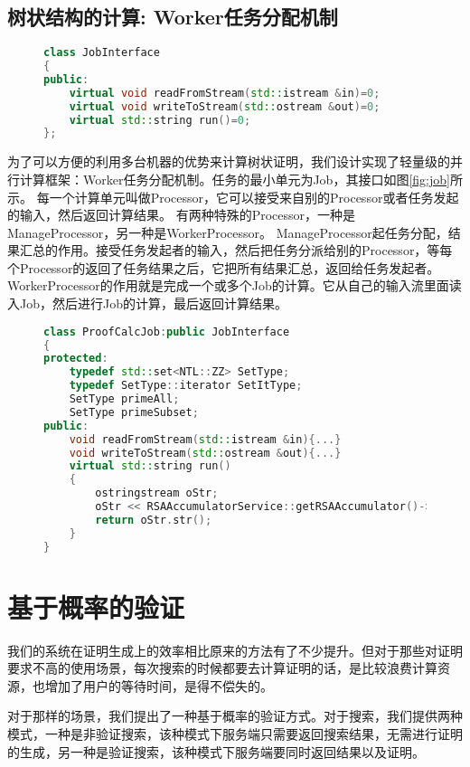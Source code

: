 \subsection{树状结构的计算: Worker任务分配机制}
\begin{figure}[htb]
\begin{lstlisting}[language=C++] 
class JobInterface
{
public:
    virtual void readFromStream(std::istream &in)=0;
    virtual void writeToStream(std::ostream &out)=0;
    virtual std::string run()=0;
};
\end{lstlisting}
\end{figure}

为了可以方便的利用多台机器的优势来计算树状证明，我们设计实现了轻量级的并行计算框架：Worker任务分配机制。任务的最小单元为Job，其接口如图\ref{fig:job}所示。
每一个计算单元叫做Processor，它可以接受来自别的Processor或者任务发起的输入，然后返回计算结果。
有两种特殊的Processor，一种是ManageProcessor，另一种是WorkerProcessor。
ManageProcessor起任务分配，结果汇总的作用。接受任务发起者的输入，然后把任务分派给别的Processor，等每个Processor的返回了任务结果之后，它把所有结果汇总，返回给任务发起者。
WorkerProcessor的作用就是完成一个或多个Job的计算。它从自己的输入流里面读入Job，然后进行Job的计算，最后返回计算结果。
\begin{figure}[htb]
\begin{lstlisting}[language=C++] 
class ProofCalcJob:public JobInterface
{
protected:
    typedef std::set<NTL::ZZ> SetType;
    typedef SetType::iterator SetItType;
    SetType primeAll;
    SetType primeSubset;
public:
    void readFromStream(std::istream &in){...}
    void writeToStream(std::ostream &out){...}
    virtual std::string run()
	{
        ostringstream oStr;
        oStr << RSAAccumulatorService::getRSAAccumulator()->publicGenSubsetProof(primeAll, primeSubset);
        return oStr.str();
	}
}
\end{lstlisting}
\end{figure}
\section{基于概率的验证}
我们的系统在证明生成上的效率相比原来的方法有了不少提升。但对于那些对证明要求不高的使用场景，每次搜索的时候都要去计算证明的话，是比较浪费计算资源，也增加了用户的等待时间，是得不偿失的。

对于那样的场景，我们提出了一种基于概率的验证方式。对于搜索，我们提供两种模式，一种是非验证搜索，该种模式下服务端只需要返回搜索结果，无需进行证明的生成，另一种是验证搜索，该种模式下服务端要同时返回结果以及证明。

